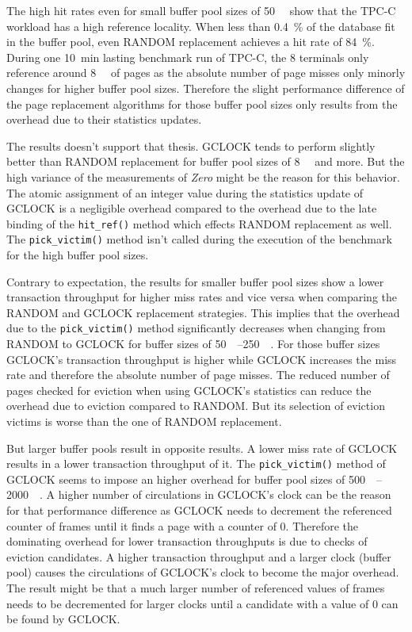     The high hit rates even for small buffer pool sizes of \SI{50}{\mebi\byte} show that the TPC-C workload has a high reference locality. When less than \SI{0.4}{\percent} of the database fit in the buffer pool, even RANDOM replacement achieves a hit rate of \SI{84}{\percent}. During one \SI{10}{\minute} lasting benchmark run of TPC-C, the \num{8} terminals only reference around \SI{8}{\gibi\byte} of pages as the absolute number of page misses only minorly changes for higher buffer pool sizes. Therefore the slight performance difference of the page replacement algorithms for those buffer pool sizes only results from the overhead due to their statistics updates.

    The results doesn't support that thesis. GCLOCK tends to perform slightly better than RANDOM replacement for buffer pool sizes of \SI{8}{\gibi\byte} and more. But the high variance of the measurements of \emph{Zero} might be the reason for this behavior. The atomic assignment of an integer value during the statistics update of GCLOCK is a negligible overhead compared to the overhead due to the late binding of the \lstinline{hit_ref()} method which effects RANDOM replacement as well. The \lstinline{pick_victim()} method isn't called during the execution of the benchmark for the high buffer pool sizes.

    Contrary to expectation, the results for smaller buffer pool sizes show a lower transaction throughput for higher miss rates and vice versa when comparing the RANDOM and GCLOCK replacement strategies. This implies that the overhead due to the \lstinline{pick_victim()} method significantly decreases when changing from RANDOM to GCLOCK for buffer sizes of \SIrange{50}{250}{\mebi\byte}. For those buffer sizes GCLOCK's transaction throughput is higher while GCLOCK increases the miss rate and therefore the absolute number of page misses. The reduced number of pages checked for eviction when using GCLOCK's statistics can reduce the overhead due to eviction compared to RANDOM. But its selection of eviction victims is worse than the one of RANDOM replacement.

    But larger buffer pools result in opposite results. A lower miss rate of GCLOCK results in a lower transaction throughput of it. The \lstinline{pick_victim()} method of GCLOCK seems to impose an higher overhead for buffer pool sizes of \SIrange{500}{2000}{\mebi\byte}. A higher number of circulations in GCLOCK's clock can be the reason for that performance difference as GCLOCK needs to decrement the referenced counter of frames until it finds a page with a counter of \num{0}. Therefore the dominating overhead for lower transaction throughputs is due to checks of eviction candidates. A higher transaction throughput and a larger clock (buffer pool) causes the circulations of GCLOCK's clock to become the major overhead. The result might be that a much larger number of referenced values of frames needs to be decremented for larger clocks until a candidate with a value of \num{0} can be found by GCLOCK.

